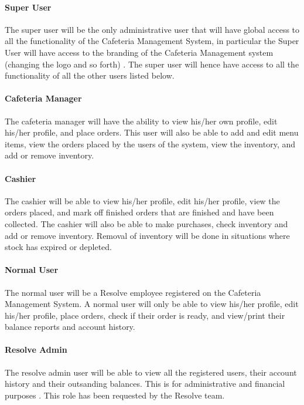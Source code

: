 \documentclass[a4paper,12pt]{article}
\begin{document}
\paragraph{Super User\\}
The super user will be the only administrative user that will have global access to all the functionality of the Cafeteria Management System, in particular the Super User will have access to the branding of the Cafeteria Management system (changing the logo and so forth) . The super user will hence have access to all the functionality of all the other users listed below.

\paragraph{ Cafeteria Manager\\}
The cafeteria manager will have the ability to view his/her own profile, edit his/her profile, and place orders. This user will also be able to add and edit menu items, view the orders placed by the users of the system, view the inventory, and add or remove inventory. 

\paragraph{ Cashier\\}
The cashier will be able to view his/her profile, edit his/her profile, view the orders placed, and mark off finished orders that are finished and have been collected. The cashier will also be able to make purchases, check inventory and add or remove inventory. Removal of inventory will be done in situations where stock has expired or depleted.

\paragraph{ Normal User\\}
The normal user will be a Resolve employee registered on the Cafeteria Management System.  A normal user will only be able to view his/her profile, edit his/her profile, place orders, check if their order is ready, and view/print their balance reports and account history.

\paragraph{ Resolve Admin\\}
The resolve admin user will be able to view all the registered users, their account history and their outsanding balances. This is for administrative and financial purposes . This role has been requested by the Resolve team.
\end{document}
